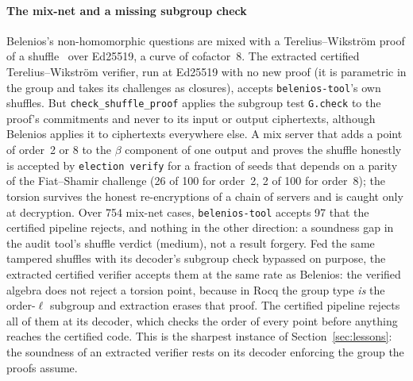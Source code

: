 \paragraph{The mix-net and a missing subgroup check}
Belenios's non-homomorphic questions are mixed with a
Terelius--Wikstr\"om proof of a shuffle~\cite{haenni2017pseudocode} over
Ed25519, a curve of cofactor~8. The extracted certified
Terelius--Wikstr\"om verifier, run at Ed25519 with no new proof (it is
parametric in the group and takes its challenges as closures), accepts
\texttt{belenios-tool}'s own shuffles. But \texttt{check\_shuffle\_proof}
applies the subgroup test \texttt{G.check} to the proof's commitments and
never to its input or output ciphertexts, although Belenios applies it to
ciphertexts everywhere else. A mix server that adds a point of order~2 or
8 to the $\beta$ component of one output and proves the shuffle honestly
is accepted by \texttt{election verify} for a fraction of seeds that
depends on a parity of the Fiat--Shamir challenge (26 of 100 for order~2,
2 of 100 for order~8); the torsion survives the honest re-encryptions of a
chain of servers and is caught only at decryption. Over 754 mix-net
cases, \texttt{belenios-tool} accepts 97 that the certified pipeline
rejects, and nothing in the other direction: a soundness gap in the audit
tool's shuffle verdict (medium), not a result forgery.  Fed the same tampered shuffles with its decoder's
subgroup check bypassed on purpose, the extracted certified verifier
accepts them at the same rate as Belenios: the verified algebra does not
reject a torsion point, because in Rocq the group type \emph{is} the
order-$\ell$ subgroup and extraction erases that proof. The certified
pipeline rejects all of them at its decoder, which checks the order of
every point before anything reaches the certified code. This is the
sharpest instance of Section~\ref{sec:lessons}: the soundness of an
extracted verifier rests on its decoder enforcing the group the proofs
assume.

